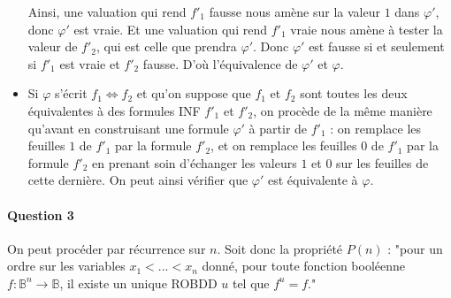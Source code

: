 \documentclass[a4paper,11pt]{article}
\begin{document}
\begin{itemize}
		Ainsi, une valuation qui rend ${f'}_1$ fausse nous amène sur la valeur $1$ dans $\varphi'$, donc $\varphi'$ est vraie. Et une valuation qui rend ${f'}_1$ vraie nous amène à tester la valeur de ${f'}_2$, qui est celle que prendra $\varphi'$. Donc $\varphi'$ est fausse si et seulement si ${f'}_1$ est vraie et ${f'}_2$ fausse. D'où l'équivalence de $\varphi'$ et $\varphi$.
		\item Si $\varphi$ s'écrit $f_1 \Leftrightarrow f_2$ et qu'on suppose que $f_1$ et $f_2$ sont toutes les deux équivalentes à des formules INF ${f'}_1$ et ${f'}_2$, on procède de la même manière qu'avant en construisant une formule $\varphi'$ à partir de ${f'}_1$ : on remplace les feuilles $1$ de ${f'}_1$ par la formule ${f'}_2$, et on remplace les feuilles $0$ de ${f'}_1$ par la formule ${f'}_2$ en prenant soin d'échanger les valeurs $1$ et $0$ sur les feuilles de cette dernière.
		On peut ainsi vérifier que $\varphi'$ est équivalente à $\varphi$.
 		\end{itemize}
	
		\paragraph{Question 3} On peut procéder par récurrence sur $n$.
		Soit donc la propriété $P(n)$ : "pour un ordre sur les variables $x_1 < ... < x_n$ donné, pour toute fonction booléenne $f : \mathbb{B}^n \rightarrow \mathbb{B}$, il existe un unique ROBDD $u$ tel que $f^u = f$."
		
\end{document}
